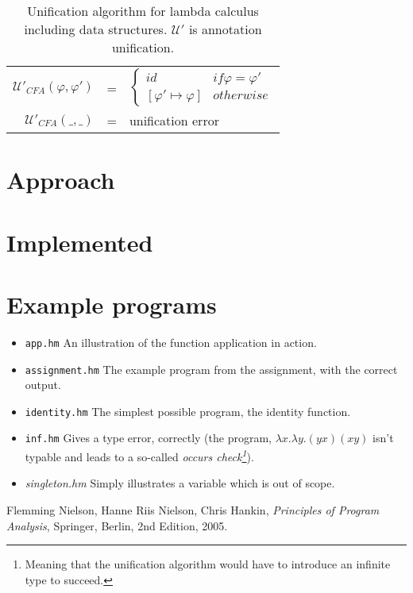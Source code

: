 \documentclass[a4paper]{article}
\begin{document}
\begin{table}
\begin{tabular}{rcb{7cm}}
        $\mathcal{U}'_{CFA}(\varphi,\varphi')$ & = & \parbox{\textwidth}{$ \left\{
\begin{array}{ll}
    id & if \varphi = \varphi' \\
    \left[ \varphi' \mapsto \varphi\right] & otherwise 
\end{array}
\right. $ } \\
        $\mathcal{U}'_{CFA}(\_,\_)$ & = & unification error \\
        \hline
    \end{tabular}
    \caption{Unification algorithm for lambda calculus including data structures. $\mathcal{U}'$ is 
    annotation unification.}
    \label{tab:algoU}
\end{table}
\section{Approach}


\section{Implemented}

\section{Example programs}

\begin{itemize}
    \item \texttt{app.hm} An illustration of the function application in action. 
    \item \texttt{assignment.hm} The example program from the assignment, with
        the correct output. 
    \item \texttt{identity.hm} The simplest possible program, the identity
        function. 
    \item \texttt{inf.hm} Gives a type error, correctly (the program, $\lambda
        x.
        \lambda y . (y x) (x y)$ isn't typable and leads to a so-called
        \emph{occurs check\footnote{Meaning that the unification algorithm would
        have to introduce an infinite type to succeed.}}).
    \item \textit{singleton.hm} Simply illustrates a variable which is out of
        scope. 
\end{itemize}



\begin{thebibliography}{9}

  {Flemming Nielson, Hanne Riis Nielson, Chris Hankin},
  \emph{Principles of Program Analysis},
  Springer, Berlin,
  2nd Edition,
  2005.

\end{thebibliography}
\end{document}
